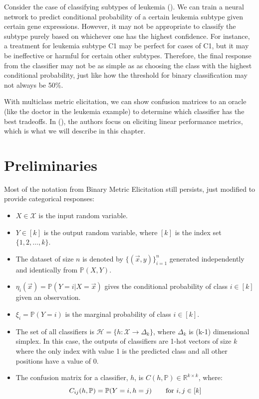 \documentclass[
  letterpaper,
  numbers=noenddot,
  DIV=11,
  oneside]{scrreprt}
\theoremstyle{remark}
\begin{document}
Consider the case of classifying subtypes of leukemia
(). We can
train a neural network to predict conditional probability of a certain
leukemia subtype given certain gene expressions. However, it may not be
appropriate to classify the subtype purely based on whichever one has
the highest confidence. For instance, a treatment for leukemia subtype
C1 may be perfect for cases of C1, but it may be ineffective or harmful
for certain other subtypes. Therefore, the final response from the
classifier may not be as simple as as choosing the class with the
highest conditional probability, just like how the threshold for binary
classification may not always be 50\%.

With multiclass metric elicitation, we can show confusion matrices to an
oracle (like the doctor in the leukemia example) to determine which
classifier has the best tradeoffs. In
(), the
authors focus on eliciting linear performance metrics, which is what we
will describe in this chapter.

\section{Preliminaries}\label{preliminaries}

Most of the notation from Binary Metric Elicitation still persists, just
modified to provide categorical responses:

\begin{itemize}
\item
  \(X \in \mathcal{X}\) is the input random variable.
\item
  \(Y \in [k]\) is the output random variable, where \([k]\) is the
  index set \(\{1, 2, \dots, k\}\).
\item
  The dataset of size \(n\) is denoted by \(\{(\vec{x}, y)\}_{i=1}^n\)
  generated independently and identically from \(\mathbb{P}(X, Y)\).
\item
  \(\eta_i(\vec{x}) = \mathbb{P}(Y=i | X=\vec{x})\) gives the
  conditional probability of class \(i \in [k]\) given an observation.
\item
  \(\xi_i = \mathbb{P}(Y=i)\) is the marginal probability of class
  \(i \in [k]\).
\item
  The set of all classifiers is
  \(\mathcal{H} = \{h : \mathcal{X} \rightarrow \Delta_k\}\), where
  \(\Delta_k\) is (k-1) dimensional simplex. In this case, the outputs
  of classifiers are 1-hot vectors of size \(k\) where the only index
  with value 1 is the predicted class and all other positions have a
  value of 0.
\item
  The confusion matrix for a classifier, \(h\), is
  \(C(h, \mathbb{P}) \in \mathbb{R}^{k \times k}\), where:
  \[C_{ij}(h, \mathbb{P}) = \mathbb{P}(Y=i, h=j) \text{\qquad for } i, j \in [k]\]
\end{itemize}
\end{document}
